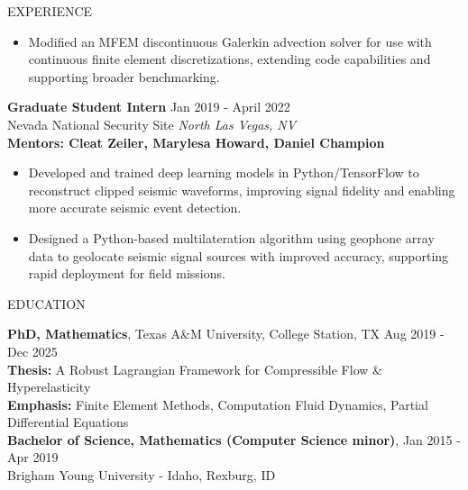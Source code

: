 \documentclass{resume} %
\begin{document}
\begin{rSection}{EXPERIENCE}
\begin{itemize}
    \item Modified an MFEM discontinuous Galerkin advection solver for use with continuous finite element discretizations, extending code capabilities and supporting broader benchmarking.
\end{itemize}
 \vspace{1em}
\textbf{Graduate Student Intern} \hfill Jan 2019 - April 2022\\
Nevada National Security Site \hfill \textit{North Las Vegas, NV} \\
{\bf Mentors: Cleat Zeiler, Marylesa Howard, Daniel Champion}
 \begin{itemize}
     \item Developed and trained deep learning models in Python/TensorFlow to reconstruct clipped seismic waveforms, improving signal fidelity and enabling more accurate seismic event detection.
    \item Designed a Python-based multilateration algorithm using geophone array data to geolocate seismic signal sources with improved accuracy, supporting rapid deployment for field missions.
 \end{itemize}

\end{rSection} 

\begin{rSection}{EDUCATION}



{\bf PhD, Mathematics}, Texas A\&M University, College Station, TX \hfill {Aug 2019 - Dec 2025} \\
\textbf{Thesis:} A Robust Lagrangian Framework for Compressible Flow \& Hyperelasticity \\
\textbf{Emphasis:} Finite Element Methods, Computation Fluid Dynamics, Partial Differential Equations \\

{\bf Bachelor of Science, Mathematics (Computer Science minor)}, \hfill
{Jan 2015 - Apr 2019} \\
Brigham Young University - Idaho, Rexburg, ID 

\end{rSection}
\end{document}
